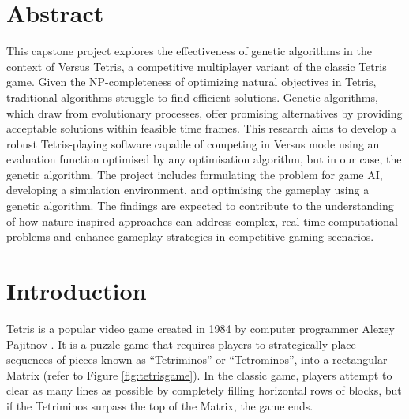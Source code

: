 \documentclass[a4paper, 12pt]{extreport}
\begin{document}
	
	\chapter*{Abstract}
	
	This capstone project explores the effectiveness of genetic algorithms in the context of Versus Tetris, a competitive multiplayer variant of the classic Tetris game. Given the NP-completeness of optimizing natural objectives in Tetris, traditional algorithms struggle to find efficient solutions. Genetic algorithms, which draw from evolutionary processes, offer promising alternatives by providing acceptable solutions within feasible time frames. This research aims to develop a robust Tetris-playing software capable of competing in Versus mode using an evaluation function optimised by any optimisation algorithm, but in our case, the genetic algorithm. The project includes formulating the problem for game AI, developing a simulation environment, and optimising the gameplay using a genetic algorithm. The findings are expected to contribute to the understanding of how nature-inspired approaches can address complex, real-time computational problems and enhance gameplay strategies in competitive gaming scenarios.
	
	
	\tableofcontents
	
	\listoftables
	
	\listoffigures
	
	\chapter{Introduction}
	
	
	Tetris is a popular video game created in 1984 by computer programmer Alexey Pajitnov  \cite{about-tetris}. It is a puzzle game that requires players to strategically place sequences of pieces known as ``Tetriminos'' or ``Tetrominos'', into a rectangular Matrix (refer to Figure \ref{fig:tetrisgame}). In the classic game, players attempt to clear as many lines as possible by completely filling horizontal rows of blocks, but if the Tetriminos surpass the top of the Matrix, the game ends.
	
\end{document}
